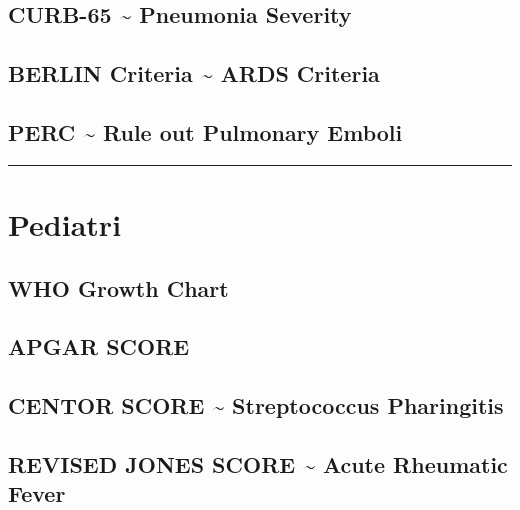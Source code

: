 \documentclass[
]{book}
\begin{document}
\hypertarget{curb-65-pneumonia-severity}{%
\subsection{CURB-65 \textasciitilde{} Pneumonia Severity}\label{curb-65-pneumonia-severity}}

\hypertarget{berlin-criteria-ards-criteria}{%
\subsection{BERLIN Criteria \textasciitilde{} ARDS Criteria}\label{berlin-criteria-ards-criteria}}

\hypertarget{perc-rule-out-pulmonary-emboli}{%
\subsection{PERC \textasciitilde{} Rule out Pulmonary Emboli}\label{perc-rule-out-pulmonary-emboli}}

\begin{center}\rule{0.5\linewidth}{0.5pt}\end{center}

\hypertarget{pediatri}{%
\section{Pediatri}\label{pediatri}}

\hypertarget{who-growth-chart}{%
\subsection{WHO Growth Chart}\label{who-growth-chart}}

\hypertarget{apgar-score}{%
\subsection{APGAR SCORE}\label{apgar-score}}

\hypertarget{centor-score-streptococcus-pharingitis}{%
\subsection{CENTOR SCORE \textasciitilde{} Streptococcus Pharingitis}\label{centor-score-streptococcus-pharingitis}}

\hypertarget{revised-jones-score-acute-rheumatic-fever}{%
\subsection{REVISED JONES SCORE \textasciitilde{} Acute Rheumatic Fever}\label{revised-jones-score-acute-rheumatic-fever}}
\end{document}
